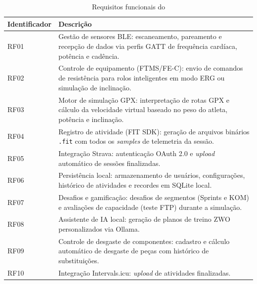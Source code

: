 \begin{table}[h]
    \centering
    \caption{Requisitos funcionais do \argus{}}
    \label{tab:rf}
    \small
    \begin{tabular}{
        >{\raggedright\arraybackslash}p{4.2cm}
        >{\raggedright\arraybackslash}p{10.2cm}
    }
        \toprule
        \textbf{Identificador} & \textbf{Descrição} \\
        \midrule
        RF01 & Gestão de sensores BLE: escaneamento, pareamento e recepção de
        dados via perfis GATT de frequência cardíaca, potência e cadência. \\
        RF02 & Controle de equipamento (FTMS/FE-C): envio de comandos de
        resistência para rolos inteligentes em modo ERG ou simulação de
        inclinação. \\
        RF03 & Motor de simulação GPX: interpretação de rotas GPX e cálculo da
        velocidade virtual baseado no peso do atleta, potência e inclinação. \\
        RF04 & Registro de atividade (FIT SDK): geração de arquivos binários
        \texttt{.fit} com todos os \textit{samples} de telemetria da sessão. \\
        RF05 & Integração Strava: autenticação OAuth 2.0 e \textit{upload}
        automático de sessões finalizadas. \\
        RF06 & Persistência local: armazenamento de usuários, configurações,
        histórico de atividades e recordes em SQLite local. \\
        RF07 & Desafios e gamificação: desafios de segmentos (Sprints e KOM) e
        avaliações de capacidade (teste FTP) durante a simulação. \\
        RF08 & Assistente de IA local: geração de planos de treino ZWO
        personalizados via Ollama. \\
        RF09 & Controle de desgaste de componentes: cadastro e cálculo automático
        de desgaste de peças com histórico de substituições. \\
        RF10 & Integração Intervals.icu: \textit{upload} de atividades
        finalizadas. \\
        \bottomrule
    \end{tabular}
\end{table}

